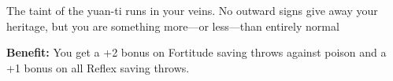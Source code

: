 
The taint of the yuan-ti runs in your veins. No outward signs give away your heritage, but you are something more—or less—than
entirely normal

\textbf{Benefit:} You get a +2 bonus on Fortitude saving throws against poison and a +1 bonus on all Reflex saving throws.